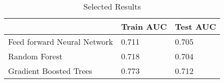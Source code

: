 \begin{table}
\caption{Selected Results}
\begin{tabular}{lll}

                            & Train AUC & Test AUC \\ \hline
Feed forward Neural Network & 0.711     & 0.705    \\
Random Forest               & 0.718     & 0.704    \\
Gradient Boosted Trees      & 0.773     & 0.712   
\end{tabular}
\end{table}